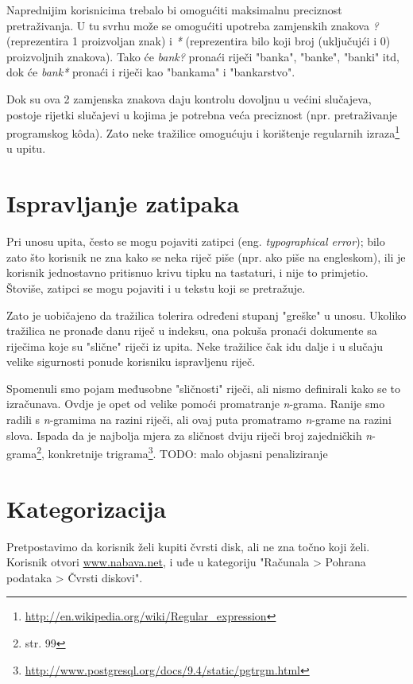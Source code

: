 \documentclass[11pt]{scrreprt}
\begin{document}
Naprednijim korisnicima trebalo bi omogućiti maksimalnu preciznost pretraživanja. U tu svrhu može se omogućiti upotreba zamjenskih znakova \textit{?} (reprezentira 1 proizvoljan znak) i \textit{*} (reprezentira bilo koji broj (uključujći i 0) proizvoljnih znakova). Tako će \textit{bank?} pronaći riječi "banka", "banke", "banki" itd, dok će \textit{bank*} pronaći i riječi kao "bankama" i "bankarstvo".

Dok su ova 2 zamjenska znakova daju kontrolu dovoljnu u većini slučajeva, postoje rijetki slučajevi u kojima je potrebna veća preciznost (npr. pretraživanje programskog kôda). Zato neke tražilice omogućuju i korištenje regularnih izraza\footnote{\url{http://en.wikipedia.org/wiki/Regular_expression}} u upitu.

\section{Ispravljanje zatipaka}

Pri unosu upita, često se mogu pojaviti zatipci (eng. \textit{typographical error}); bilo zato što korisnik ne zna kako se neka riječ piše (npr. ako piše na engleskom), ili je korisnik jednostavno pritisnuo krivu tipku na tastaturi, i nije to primjetio. Štoviše, zatipci se mogu pojaviti i u tekstu koji se pretražuje.

Zato je uobičajeno da tražilica tolerira određeni stupanj "greške" u unosu. Ukoliko tražilica ne pronađe danu riječ u indeksu, ona pokuša pronaći dokumente sa riječima koje su "slične" riječi iz upita. Neke tražilice čak idu dalje i u slučaju velike sigurnosti ponude korisniku ispravljenu riječ.

Spomenuli smo pojam međusobne "sličnosti" riječi, ali nismo definirali kako se to izračunava. Ovdje je opet od velike pomoći promatranje \textit{n}-grama. Ranije smo radili s \textit{n}-gramima na razini riječi, ali ovaj puta promatramo \textit{n}-grame na razini slova. Ispada da je najbolja mjera za sličnost dviju riječi broj zajedničkih \textit{n}-grama\footnote{\cite{taming} str. 99}, konkretnije trigrama\footnote{\url{http://www.postgresql.org/docs/9.4/static/pgtrgm.html}}. TODO: malo objasni penaliziranje

\section{Kategorizacija}

Pretpostavimo da korisnik želi kupiti čvrsti disk, ali ne zna točno koji želi. Korisnik otvori \url{www.nabava.net}, i uđe u kategoriju "Računala > Pohrana podataka > Čvrsti diskovi".
\end{document}
